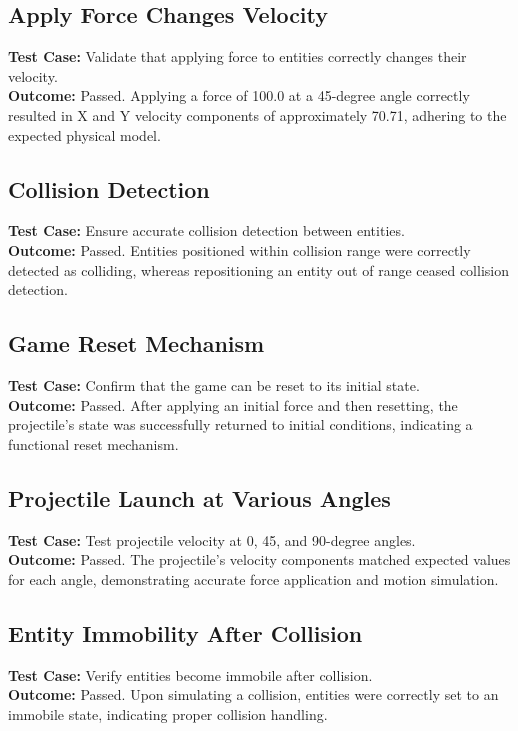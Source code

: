 \documentclass[12pt]{article}
\begin{document}
\subsection{Apply Force Changes Velocity}
\textbf{Test Case:} Validate that applying force to entities correctly changes their velocity. \\
\textbf{Outcome:} Passed. Applying a force of 100.0 at a 45-degree angle correctly resulted in X and Y velocity components of approximately 70.71, adhering to the expected physical model.

\subsection{Collision Detection}
\textbf{Test Case:} Ensure accurate collision detection between entities. \\
\textbf{Outcome:} Passed. Entities positioned within collision range were correctly detected as colliding, whereas repositioning an entity out of range ceased collision detection.

\subsection{Game Reset Mechanism}
\textbf{Test Case:} Confirm that the game can be reset to its initial state. \\
\textbf{Outcome:} Passed. After applying an initial force and then resetting, the projectile's state was successfully returned to initial conditions, indicating a functional reset mechanism.

\subsection{Projectile Launch at Various Angles}
\textbf{Test Case:} Test projectile velocity at 0, 45, and 90-degree angles. \\
\textbf{Outcome:} Passed. The projectile's velocity components matched expected values for each angle, demonstrating accurate force application and motion simulation.

\subsection{Entity Immobility After Collision}
\textbf{Test Case:} Verify entities become immobile after collision. \\
\textbf{Outcome:} Passed. Upon simulating a collision, entities were correctly set to an immobile state, indicating proper collision handling.
\end{document}
